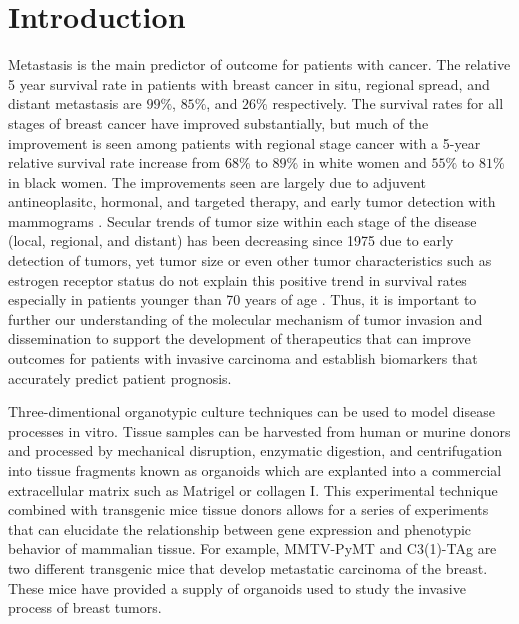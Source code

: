 \documentclass[10pt,letterpaper]{article}
\begin{document}
\section*{Introduction}

Metastasis is the main predictor of outcome for patients with cancer. The relative 5 year survival rate in patients with breast cancer in situ, regional spread, and distant metastasis are $99\%$, $85\%$, and $26\%$ respectively\cite{Siegel:2017cs}. The survival rates for all stages of breast cancer have improved substantially, but much of the improvement is seen among patients with regional stage cancer with a 5-year relative survival rate increase from $68\%$ to $89\%$ in white women and $55\%$ to $81\%$ in black women. The improvements seen are largely due to adjuvent antineoplasitc, hormonal, and targeted therapy, and early tumor detection with mammograms \cite{DeSantis:2017BC}. Secular trends of tumor size within each stage of the disease (local, regional, and distant) has been decreasing since 1975 due to early detection of tumors\cite{Elkin:2005cts}, yet tumor size or even other tumor characteristics such as estrogen receptor status do not explain this positive trend in survival rates especially in patients younger than 70 years of age \cite{Park:2015ibc}. Thus, it is important to further our understanding of the molecular mechanism of tumor invasion and dissemination to support the development of therapeutics that can improve outcomes for patients with invasive carcinoma and establish biomarkers that accurately predict patient prognosis.

Three-dimentional organotypic culture techniques can be used to model disease processes in vitro. Tissue samples can be harvested from human or murine donors and processed by mechanical disruption, enzymatic digestion, and centrifugation into tissue fragments known as organoids which are explanted into a commercial extracellular matrix such as Matrigel or collagen I\cite {Shamir:2014td}. This experimental technique combined with transgenic mice tissue donors allows for a series of experiments that can elucidate the relationship between gene expression and phenotypic behavior of mammalian tissue. For example, MMTV-PyMT and C3(1)-TAg are two different transgenic mice that develop metastatic carcinoma of the breast\cite{Maroulakou:1994pm,Guy:1992im}. These mice have provided a supply of organoids used to study the invasive process of breast tumors\cite{Shamir:2014td,Cheung:2013ci,Cheung:2016pcb}.
\end{document}
